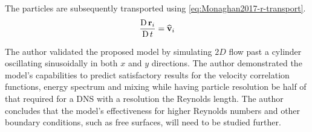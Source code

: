 The particles are subsequently transported using \ref{eq:Monaghan2017-r-transport}.
\begin{equation}
	\frac{\operatorname{D} \mathbf{r}_i}{\operatorname{D} t} = \widehat{\mathbf{v}}_i
	\label{eq:Monaghan2017-r-transport}
\end{equation}

The author validated the proposed model by simulating $2D$ flow past a cylinder oscillating sinusoidally in both $x$ and $y$ directions.
The author demonstrated the model's capabilities to predict satisfactory results for the velocity correlation functions, energy spectrum and mixing while having particle resolution be half of that required for a DNS with a resolution the Reynolds length. The author concludes that the model's effectiveness for higher Reynolds numbers and other boundary conditions, such as free surfaces, will need to be studied further.
